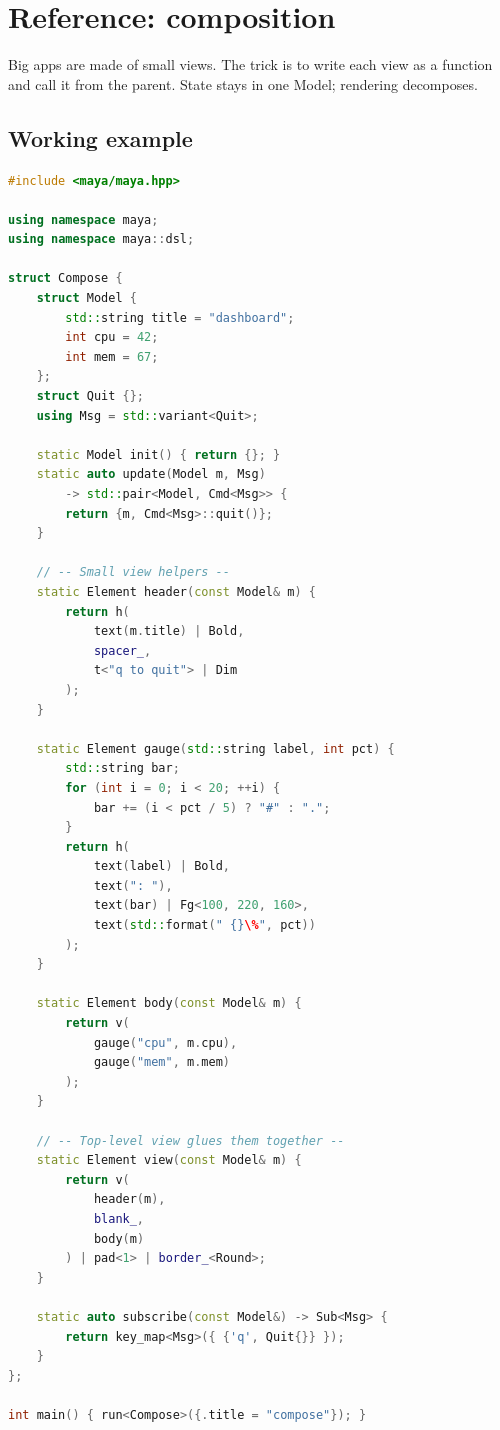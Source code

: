 \chapter{Reference: composition}
\label{ch:refman-compose}

\begin{aside}
Big apps are made of small views. The trick is to write each
view as a function and call it from the parent. State stays
in one Model; rendering decomposes.
\end{aside}

\section{Working example}

\begin{lstlisting}[language=C++]
#include <maya/maya.hpp>

using namespace maya;
using namespace maya::dsl;

struct Compose {
    struct Model {
        std::string title = "dashboard";
        int cpu = 42;
        int mem = 67;
    };
    struct Quit {};
    using Msg = std::variant<Quit>;

    static Model init() { return {}; }
    static auto update(Model m, Msg)
        -> std::pair<Model, Cmd<Msg>> {
        return {m, Cmd<Msg>::quit()};
    }

    // -- Small view helpers --
    static Element header(const Model& m) {
        return h(
            text(m.title) | Bold,
            spacer_,
            t<"q to quit"> | Dim
        );
    }

    static Element gauge(std::string label, int pct) {
        std::string bar;
        for (int i = 0; i < 20; ++i) {
            bar += (i < pct / 5) ? "#" : ".";
        }
        return h(
            text(label) | Bold,
            text(": "),
            text(bar) | Fg<100, 220, 160>,
            text(std::format(" {}\%", pct))
        );
    }

    static Element body(const Model& m) {
        return v(
            gauge("cpu", m.cpu),
            gauge("mem", m.mem)
        );
    }

    // -- Top-level view glues them together --
    static Element view(const Model& m) {
        return v(
            header(m),
            blank_,
            body(m)
        ) | pad<1> | border_<Round>;
    }

    static auto subscribe(const Model&) -> Sub<Msg> {
        return key_map<Msg>({ {'q', Quit{}} });
    }
};

int main() { run<Compose>({.title = "compose"}); }
\end{lstlisting}

